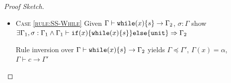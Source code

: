 \documentclass[twoside, english]{sdqthesis}
\newcommand{\set}[1]{\left\{ #1 \right\}}
\newcommand{\bbracket}[1]{\llbracket #1 \rrbracket}
\theoremstyle{definition}
\begin{document}
\begin{proof}[Proof Sketch]
\begin{itemize}
    Cases of $\Gamma \vdash *x = z \Rightarrow \Gamma_2$:
    \begin{itemize}
      \item \textsc{Case \cref{rule:Assign-Strong}} gives:
        $\Gamma(z) = \beta$, $\Gamma \vdash *x \in \set{y}$, $\Gamma \vdash \gamma \text{ fresh}$.
    
        Choose $\Gamma_2 = \Gamma_1 = \Gamma[y \mapsto \gamma], \gamma \doteq \beta$.
        With $\Gamma \vdash \alpha \text{ fresh}$ using \cref{lem:conservatice-reference-typing} yields $\bbracket{\sigma(x)} = \&y$.
        \cref{lem:conf-sym-exec} yields $\sigma[y \mapsto \bbracket{\sigma(z)}] : \Gamma[y \mapsto \gamma], \gamma \doteq \beta$
      \item \textsc{Case \cref{rule:Assign-Weak}} gives:
        $\Gamma \vdash z: \tau$, $\Gamma \vdash *x \in \set{\bar{y_i}}$
        $\Gamma \vdash y_i : \set{\beta_i : b_i \mid \varphi_i }$
        $\Gamma \vdash \tau \preceq \set{\beta_j : b_j \mid \varphi_j}$ for $j \in [1, n]$.
        
         gives $\bbracket{\sigma(x)} = \&y_i$ for some $i \in [1, n]$.

        At this point it remains to be shown that the assigned type does not change conformance for the post state. We will show this in two steps: First we show that the assigned value preserves conformance, but for a different context. Then we will show that this context is a subcontext of $\Gamma$.

        Using \cref{lem:conf-sym-exec} we get $\sigma[y_j \mapsto \bbracket{z}\sigma] : \Gamma[y_j \mapsto \beta_j], (\alpha \simeq \bbracket{z}\Gamma)$ for all $j \in [1, n]$.

        By assumption $\Gamma \vdash \tau \preceq \set{\beta_j : b_j \mid \varphi_j}$ for every $j \in [1, n]$.
        Using \cref{lem:conservative-subtype} we get $\sigma[y_j \mapsto \bbracket{\sigma(z)}] : \Gamma$.
        For $\Gamma = \Gamma_1 = \Gamma_2$ the proof obligation is satisfied.
    \end{itemize}
    

  \item \textsc{Case \cref{rule:SS-While}}
    Given $\Gamma \vdash \code{while}(x) \{s\} \rightarrow \Gamma_2$, $\sigma : \Gamma$ 
    show $\exists \Gamma_1, \sigma : \Gamma_1 \wedge \Gamma_1 \vdash \code{if}(x) \{\code{while}(x) \{s\}\}\code{else}\{\code{unit}\} \Rightarrow \Gamma_2$

    Rule inversion over $\Gamma \vdash \code{while}(x) \{s\} \rightarrow \Gamma_2$ yields $\Gamma \preceq \Gamma'$, $\Gamma(x) = \alpha$, $\Gamma \vdash c \rightarrow \Gamma'$


\end{itemize}
\end{proof}
\end{document}
